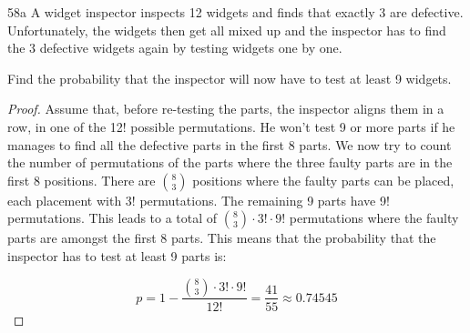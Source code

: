 \begin{exercise}{58a}
    A widget inspector inspects 12 widgets and finds that exactly 3 are defective. Unfortunately, the widgets then get all mixed up and the inspector has to find the 3 defective widgets again by testing widgets one by one.

    Find the probability that the inspector will now have to test at least 9 widgets.
\end{exercise}

\begin{proof}
    Assume that, before re-testing the parts, the inspector aligns them in a row, in one of the 12! possible permutations. He won't test 9 or more parts if he manages to find all the defective parts in the first 8 parts. We now try to count the number of permutations of the parts where the three faulty parts are in the first 8 positions. There are $8 \choose 3$ positions where the faulty parts can be placed, each placement with 3! permutations. The remaining 9 parts have 9! permutations. This leads to a total of ${8 \choose 3} \cdot 3! \cdot 9!$ permutations where the faulty parts are amongst the first 8 parts.
    This means that the probability that the inspector has to test at least 9 parts is:

    $$p = 1 - \frac{ {8 \choose 3} \cdot 3! \cdot 9!}{12!} = \frac{41}{55} \approx 0.74545$$
\end{proof}

